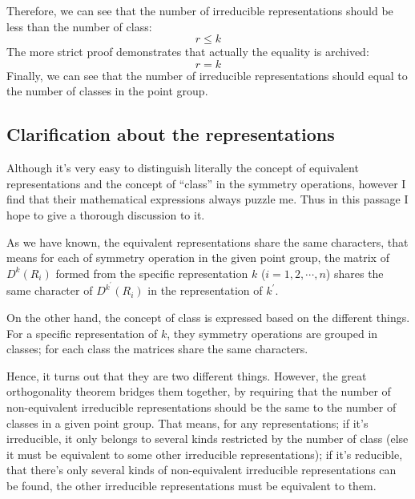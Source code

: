 Therefore, we can see that the number of irreducible representations
should be less than the number of class:
\begin{equation}\label{}
  r \leq k
\end{equation}
The more strict proof demonstrates that actually the equality is
archived:
\begin{equation}\label{}
  r = k
\end{equation}
Finally, we can see that the number of irreducible representations
should equal to the number of classes in the point group.

\subsection{Clarification about the representations}
%
%

Although it's very easy to distinguish literally the concept of
equivalent representations and the concept of ``class'' in the
symmetry operations, however I find that their mathematical
expressions always puzzle me. Thus in this passage I hope to give a
thorough discussion to it.

As we have known, the equivalent representations share the same
characters, that means for each of symmetry operation in the given
point group, the matrix of $D^{k}(R_{i})$ formed from the specific
representation $k$ ($i = 1, 2, \cdots, n$) shares the same character
of $D^{k^{'}}(R_{i})$ in the representation of $k^{'}$.

On the other hand, the concept of class is expressed based on the
different things. For a specific representation of $k$, they symmetry
operations are grouped in classes; for each class the matrices share
the same characters.

Hence, it turns out that they are two different things. However, the
great orthogonality theorem bridges them together, by requiring that
the number of non-equivalent irreducible representations should be the
same to the number of classes in a given point group. That means, for
any representations; if it's irreducible, it only belongs to several
kinds restricted by the number of class (else it must be equivalent to
some other irreducible representations); if it's reducible, that
there's only several kinds of non-equivalent irreducible
representations can be found, the other irreducible representations
must be equivalent to them.

